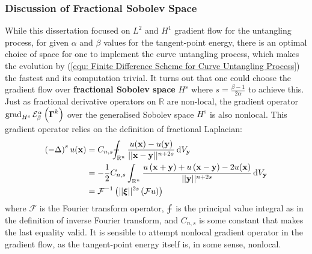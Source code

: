 \documentclass[../dissertation.tex]{subfiles}
\begin{document}
\subsubsection{Discussion of Fractional Sobolev Space}
While this dissertation focused on $L^2$ and $H^1$ gradient flow for the untangling process,
for given $\alpha$ and $\beta$ values for the tangent-point energy,
there is an optimal choice of space for one to implement the curve untangling process,
which makes the evolution by (\ref{equ: Finite Difference Scheme for Curve Untangling Process}) the fastest
and its computation trivial.
It turns out that one could choose the gradient flow over \textbf{fractional Sobolev space} $H^s$
where $s = \frac{\beta - 1}{2 \alpha}$ to achieve this\cite{YSC2021}.
Just as fractional derivative operators on $\mathbb{R}$ are non-local,
the gradient operator $\operatorname{grad}_{H^s} \mathcal{E}_{\beta}^{\alpha} \left( \boldsymbol{\Gamma}^k \right)$ over
the generalised Sobolev space $H^s$ is also nonlocal.
This gradient operator relies on the definition of fractional Laplacian\cite{DINEZZA2012521}:
\begin{align}
    \left( -\laplacian \right)^s u(\xbf) &= C_{n,s} \dashint_{\mathbb{R}^n} \frac{u(\xbf) - u(\ybf)}{\norm{\xbf - \ybf}^{n+2s}} \intd V_{\ybf} \\
    &= -\frac{1}{2} C_{n,s} \int_{\mathbb{R}^n} \frac{u\left( \xbf + \ybf \right) + u\left( \xbf - \ybf \right) - 2 u(\xbf)}{\norm{\ybf}^{n+2s}} \intd V_{\ybf} \\
    &= \mathcal{F}^{-1} \left( \norm{\xibf}^{2s} \left( \mathcal{F} u \right) \right)
\end{align}
where $\mathcal{F}$ is the Fourier transform operator, $\dashint$ is the principal value integral as in the definition of inverse Fourier transform, and $C_{n,s}$ is some constant that makes the last equality valid.
It is sensible to attempt nonlocal gradient operator in the gradient flow, as the tangent-point energy itself is, in some sense, nonlocal.
\end{document}
